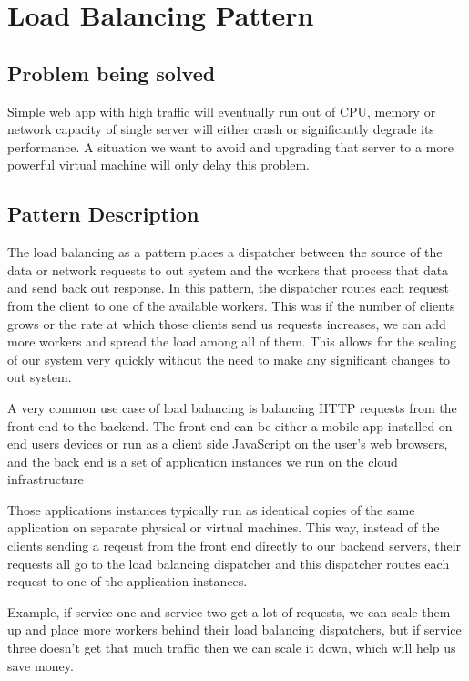 \section{Load Balancing Pattern}

\subsection{Problem being solved}
Simple web app with high traffic will eventually run out of CPU, memory or network capacity of single server will either crash or significantly degrade its performance.
A situation we want to avoid and upgrading that server to a more powerful virtual machine will only delay this problem.

\subsection{Pattern Description}
The load balancing as a pattern places a dispatcher between the source of the data or network requests to out system and the workers that process that data and send back out response.
In this pattern, the dispatcher routes each request from the client to one of the available workers.
This was if the number of clients grows or the rate at which those clients send us requests increases, we can add more workers and spread the load among all of them.
This allows for the scaling of our system very quickly without the need to make any significant changes to out system.

A very common use case of load balancing is balancing HTTP requests from the front end to the backend.
The front end can be either a mobile app installed on end users devices or run as a client side JavaScript on the user's web browsers,
and the back end is a set of application instances we run on the cloud infrastructure

Those applications instances typically run as identical copies of the same application on separate physical or virtual machines.
This way, instead of the clients sending a reqeust from the front end directly to our backend servers, their requests all go to the load balancing dispatcher and this dispatcher routes each request to one of the application instances.

Example, if service one and service two get a lot of requests, we can scale them up and place more workers behind their load balancing dispatchers, but if service three doesn't get that much traffic then we can scale it down, which will help us save money.

